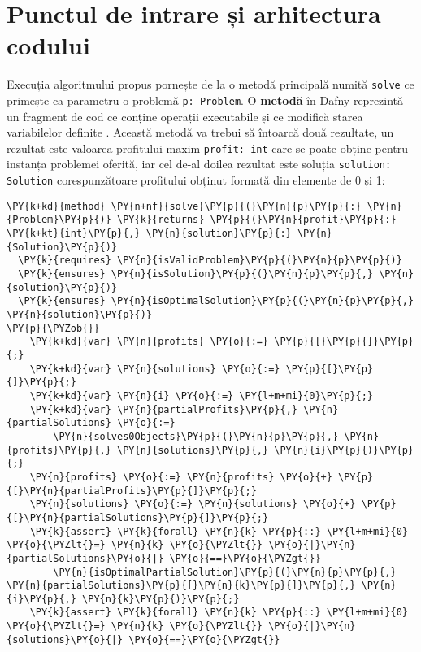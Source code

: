 \chapter{Punctul de intrare și arhitectura codului}
\begin{sloppypar}

Execuția algoritmului propus pornește de la o metodă principală numită \texttt{solve} ce primește ca parametru o problemă \texttt{p: Problem}. O \textbf{metodă} în Dafny reprezintă un fragment de cod ce conține operații executabile și ce modifică starea variabilelor definite \cite{DBLP:series/natosec/KoenigL12}. Această metodă va trebui să întoarcă două rezultate, un rezultat este valoarea profitului maxim \texttt{profit: int} care se poate obține pentru instanța problemei oferită, iar cel de-al doilea rezultat este soluția \texttt{solution: Solution} corespunzătoare profitului obținut formată din elemente de 0 și 1:
\begin{Verbatim}[commandchars=\\\{\}]
\PY{k+kd}{method} \PY{n+nf}{solve}\PY{p}{(}\PY{n}{p}\PY{p}{:} \PY{n}{Problem}\PY{p}{)} \PY{k}{returns} \PY{p}{(}\PY{n}{profit}\PY{p}{:} \PY{k+kt}{int}\PY{p}{,} \PY{n}{solution}\PY{p}{:} \PY{n}{Solution}\PY{p}{)}
  \PY{k}{requires} \PY{n}{isValidProblem}\PY{p}{(}\PY{n}{p}\PY{p}{)}
  \PY{k}{ensures} \PY{n}{isSolution}\PY{p}{(}\PY{n}{p}\PY{p}{,} \PY{n}{solution}\PY{p}{)}
  \PY{k}{ensures} \PY{n}{isOptimalSolution}\PY{p}{(}\PY{n}{p}\PY{p}{,} \PY{n}{solution}\PY{p}{)}
\PY{p}{\PYZob{}}
    \PY{k+kd}{var} \PY{n}{profits} \PY{o}{:=} \PY{p}{[}\PY{p}{]}\PY{p}{;} 
    \PY{k+kd}{var} \PY{n}{solutions} \PY{o}{:=} \PY{p}{[}\PY{p}{]}\PY{p}{;}
    \PY{k+kd}{var} \PY{n}{i} \PY{o}{:=} \PY{l+m+mi}{0}\PY{p}{;}
    \PY{k+kd}{var} \PY{n}{partialProfits}\PY{p}{,} \PY{n}{partialSolutions} \PY{o}{:=} 
        \PY{n}{solves0Objects}\PY{p}{(}\PY{n}{p}\PY{p}{,} \PY{n}{profits}\PY{p}{,} \PY{n}{solutions}\PY{p}{,} \PY{n}{i}\PY{p}{)}\PY{p}{;}
    \PY{n}{profits} \PY{o}{:=} \PY{n}{profits} \PY{o}{+} \PY{p}{[}\PY{n}{partialProfits}\PY{p}{]}\PY{p}{;}
    \PY{n}{solutions} \PY{o}{:=} \PY{n}{solutions} \PY{o}{+} \PY{p}{[}\PY{n}{partialSolutions}\PY{p}{]}\PY{p}{;}
    \PY{k}{assert} \PY{k}{forall} \PY{n}{k} \PY{p}{::} \PY{l+m+mi}{0} \PY{o}{\PYZlt{}=} \PY{n}{k} \PY{o}{\PYZlt{}} \PY{o}{|}\PY{n}{partialSolutions}\PY{o}{|} \PY{o}{==}\PY{o}{\PYZgt{}} 
        \PY{n}{isOptimalPartialSolution}\PY{p}{(}\PY{n}{p}\PY{p}{,} \PY{n}{partialSolutions}\PY{p}{[}\PY{n}{k}\PY{p}{]}\PY{p}{,} \PY{n}{i}\PY{p}{,} \PY{n}{k}\PY{p}{)}\PY{p}{;}
    \PY{k}{assert} \PY{k}{forall} \PY{n}{k} \PY{p}{::} \PY{l+m+mi}{0} \PY{o}{\PYZlt{}=} \PY{n}{k} \PY{o}{\PYZlt{}} \PY{o}{|}\PY{n}{solutions}\PY{o}{|} \PY{o}{==}\PY{o}{\PYZgt{}} 

\end{Verbatim}
\end{sloppypar}
